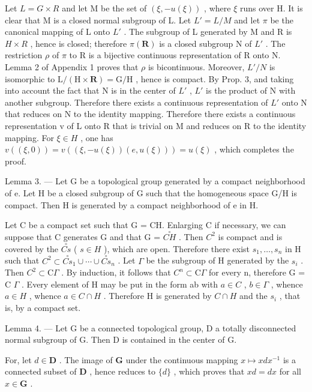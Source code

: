 Let \(L = G \times R\) and let M be the set of \((\xi, -u(\xi))\) , where \(\xi\) runs over H. It is clear that M is a closed normal subgroup of L. Let \(L' = L/M\) and let \(\pi\) be the canonical mapping of L onto \(L'\) . The subgroup of L generated by M and R is \(H \times R\) , hence is closed; therefore \(\pi(\mathbf{R})\) is a closed subgroup N of \(L'\) . The restriction \(\rho\) of \(\pi\) to R is a bijective continuous representation of R onto N. Lemma 2 of Appendix 1 proves that \(\rho\) is bicontinuous. Moreover, \(L'/N\) is isomorphic to \(\mathrm{L}/(\mathrm{H} \times \mathbf{R}) = \mathrm{G}/\mathrm{H}\) , hence is compact. By Prop. 3, and taking into account the fact that N is in the center of \(L'\) , \(L'\) is the product of N with another subgroup. Therefore there exists a continuous representation of \(L'\) onto N that reduces on N to the identity mapping. Therefore there exists a continuous representation v of L onto R that is trivial on M and reduces on R to the identity mapping. For \(\xi \in H\) , one has \(v((\xi,0)) = v((\xi,-u(\xi))(e,u(\xi))) = u(\xi)\) , which completes the proof.

Lemma 3. --- Let G be a topological group generated by a compact neighborhood of e. Let H be a closed subgroup of G such that the homogeneous space G/H is compact. Then H is generated by a compact neighborhood of e in H.

Let C be a compact set such that G = CH. Enlarging C if necessary, we can suppose that C generates G and that G = \(\overset{\circ}{CH}\) . Then \(C^{2}\) is compact and is covered by the \(\overset{\circ}{Cs}\) ( \(s \in H\) ), which are open. Therefore there exist \(s_{1}, \ldots, s_{n}\) in H such that \(C^{2} \subset \overset{\circ}{Cs}_{1} \cup \cdots \cup \overset{\circ}{Cs}_{n}\) . Let \(\Gamma\) be the subgroup of H generated by the \(s_{i}\) . Then \(C^{2} \subset \mathrm{C}\Gamma\) . By induction, it follows that \(C^{n} \subset \mathrm{C}\Gamma\) for every n, therefore G = C \(\Gamma\) . Every element of H may be put in the form ab with \(a \in C\) , \(b \in \Gamma\) , whence \(a \in H\) , whence \(a \in C \cap H\) . Therefore H is generated by \(C \cap H\) and the \(s_{i}\) , that is, by a compact set.

Lemma 4. --- Let G be a connected topological group, D a totally disconnected normal subgroup of G. Then D is contained in the center of G.

For, let \(d \in \mathbf{D}\) . The image of \(\mathbf{G}\) under the continuous mapping \(x \mapsto x dx^{-1}\) is a connected subset of \(\mathbf{D}\) , hence reduces to \(\{d\}\) , which proves that \(xd = dx\) for all \(x \in \mathbf{G}\) .

